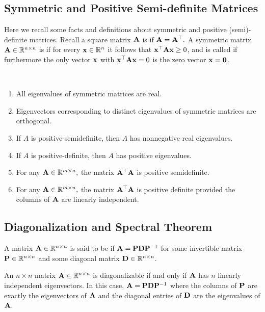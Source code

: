 \subsection{Symmetric and Positive Semi-definite Matrices}

Here we recall some facts and definitions about symmetric and positive (semi)-definite matrices. 
Recall a square matrix $\MA$ is  if $\MA = \MA^\top.$ 
A symmetric matrix $\MA \in \R^{n \times n}$ is  if for every $\vx \in \R^n$ it follows that $\vx^\top \MA \vx \geq 0$, and is called  if furthermore the only vector $\vx$ with $\vx^\top\MA\vx = 0$ is the zero vector $\vx =\vzero$.


\begin{theorem}\ 
\begin{enumerate}
    \item All eigenvalues of symmetric matrices are real. 
    \item Eigenvectors corresponding to distinct eigenvalues of symmetric matrices are orthogonal.
    \item If $A$ is positive-semidefinite, then $A$ has nonnegative real eigenvalues.
    \item If $A$ is positive-definite, then $A$ has positive eigenvalues.
    \item For any $\MA \in \R^{m \times n},$ the matrix $\MA^\top \MA$ is positive semidefinite. 
    \item For any $\MA \in \R^{m \times n},$ the matrix $\MA^\top \MA$ is positive definite provided the columns of $\MA$ are linearly independent. 
\end{enumerate}
\end{theorem}

\subsection{Diagonalization and Spectral Theorem}


A matrix $\MA \in \mathbb R^{n \times n}$ is said to be  if $\MA = \MP\MD\MP^{-1}$ for some invertible matrix $\MP \in \mathbb R^{n \times n}$ and some diagonal matrix $\MD \in \mathbb R^{n \times n}$. 


\begin{theorem}
An $n \times n$ matrix $\MA \in \mathbb R^{n \times n}$ is diagonalizable if and only if $\MA$ has $n$ linearly independent eigenvectors. In this case, 
$\MA = \MP\MD\MP^{-1}$
where the columns of $\MP$ are exactly the eigenvectors of $\MA$ and the diagonal entries of $\MD$ are the eigenvalues of $\MA$. 
\end{theorem}

